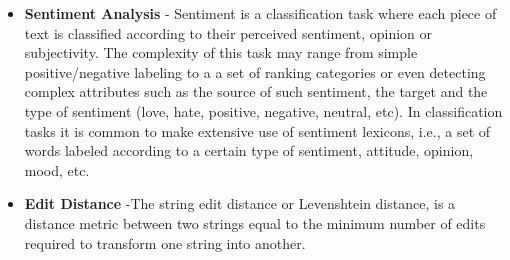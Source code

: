 \begin{itemize}
        \item \textbf{Sentiment Analysis} - Sentiment is a classification task where each piece of text is classified according to their perceived sentiment, opinion or subjectivity. The complexity of this task may range from simple positive/negative labeling to a a set of ranking categories or even detecting complex attributes such as the source of such sentiment, the target and the type of sentiment (love, hate, positive, negative, neutral, etc). In classification tasks it is common to make extensive use of sentiment lexicons, i.e., a set of words labeled according to a certain type of sentiment, attitude, opinion, mood, etc.
        \item \textbf{Edit Distance} -The string edit distance or Levenshtein distance, is a distance metric between two strings equal to the minimum number of edits required to transform one string into another.

\end{itemize}
